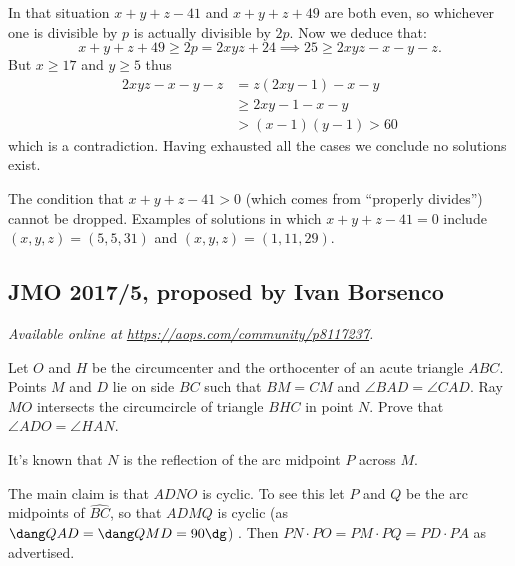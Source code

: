 \documentclass[11pt]{scrartcl}
\begin{document}
In that situation $x+y+z-41$ and $x+y+z+49$ are both even,
so whichever one is divisible by $p$
is actually divisible by $2p$.
Now we deduce that:
\[ x+y+z+49 \ge 2p = 2xyz + 24 \implies 25 \ge 2xyz-x-y-z. \]
But $x \ge 17$ and $y \ge 5$ thus
\begin{align*}
  2xyz-x-y-z &= z(2xy-1) - x - y \\
  &\ge 2xy - 1 - x - y \\
  &> (x-1)(y-1) > 60
\end{align*}
which is a contradiction.
Having exhausted all the cases we conclude no solutions exist.

The condition that $x+y+z-41 > 0$ (which comes from ``properly divides'')
cannot be dropped. Examples of solutions in which $x+y+z-41 = 0$
include $(x,y,z) = (5,5,31)$ and $(x,y,z) = (1, 11, 29)$.
\pagebreak

\subsection{JMO 2017/5, proposed by Ivan Borsenco}
\textsl{Available online at \url{https://aops.com/community/p8117237}.}
\begin{mdframed}[style=mdpurplebox,frametitle={Problem statement}]
Let $O$ and $H$ be the circumcenter
and the orthocenter of an acute triangle $ABC$.
Points $M$ and $D$ lie on side $BC$
such that $BM=CM$ and $\angle BAD = \angle CAD$.
Ray $MO$ intersects the circumcircle of triangle $BHC$ in point $N$.
Prove that $\angle ADO = \angle HAN$.
\end{mdframed}
It's known that $N$ is the reflection of
the arc midpoint $P$ across $M$.

The main claim is that $ADNO$ is cyclic.
To see this let $P$ and $Q$ be the arc midpoints of $\widehat{BC}$,
so that $ADMQ$ is cyclic
(as $\dang QAD = \dang QMD = 90\dg$) .
Then $PN \cdot PO = PM \cdot PQ = PD \cdot PA$ as advertised.
\end{document}
